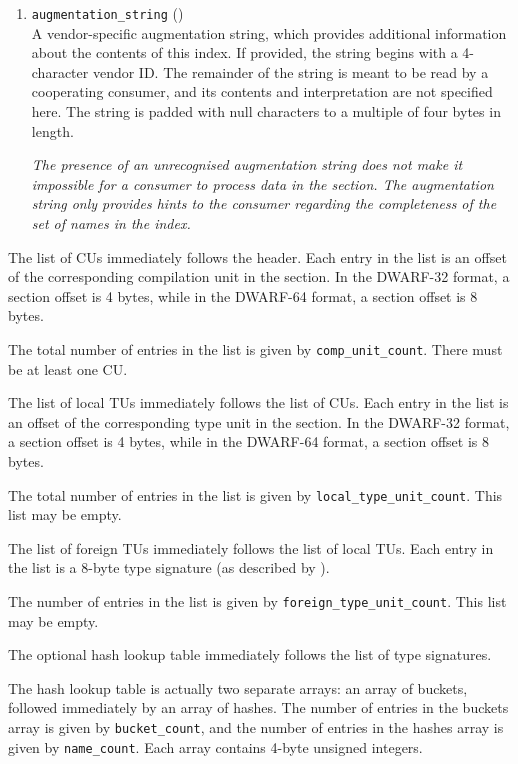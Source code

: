 \begin{enumerate}[1. ]
\item \texttt{augmentation\_string} (\HFTaugstring) \\
A vendor-specific augmentation string, which provides additional 
information about the contents of this index. If provided, the string
begins with a 4-character vendor ID. The remainder of the
string is meant to be read by a cooperating consumer, and its
contents and interpretation are not specified here. The
string is padded with null characters to a multiple of
four bytes in length.

\textit{The presence of an unrecognised augmentation string 
does not make it
impossible for a consumer to process data in the \dotdebugnames{} section.
The augmentation string only provides hints to the consumer regarding
the completeness of the set of names in the index.
}

\end{enumerate}

The list of CUs immediately follows the header. Each entry in the 
list is an offset of the corresponding compilation unit
in the \dotdebuginfo{} section.
In the DWARF-32 format, a section offset is 4 bytes, 
while in the DWARF-64 format, a section offset is 8 bytes.

The total number of entries in the list is given by \texttt{comp\_unit\_count}.
There must be at least one CU.

The list of local TUs immediately follows the list of CUs. Each 
entry in the list is an offset of the corresponding type unit
in the \dotdebuginfo{} section. 
In the DWARF-32 format, a section offset is 4 bytes, 
while in the DWARF-64 format, a section offset is 8 bytes.

The total number of entries in the list is given by
\texttt{local\_type\_unit\_count}. This list may be empty.

The list of foreign TUs immediately follows the list of local TUs.
Each entry in the list is a 8-byte type signature (as described by
\DWFORMrefsigeight).

The number of entries in the list is given by \texttt{foreign\_type\_unit\_count}.
This list may be empty.

The optional hash lookup table immediately follows the list of type signatures.

The hash lookup table is actually two separate arrays: an array of
buckets, followed immediately by an array of hashes. The number of
entries in the buckets array is given by \texttt{bucket\_count}, and the number
of entries in the hashes array is given by \texttt{name\_count}. Each array
contains 4-byte unsigned integers.

